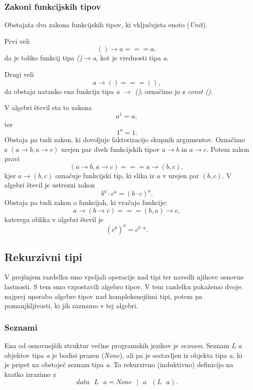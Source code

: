 \documentclass[a4paper, 12pt]{book}
\begin{document}
\subsubsection{Zakoni funkcijskih tipov}

Obstajata dva zakona funkcijskih tipov, ki vključujeta enoto (\emph{Unit}). 

\noindent Prvi veli
$$()\to a===a,$$
da je toliko funkcij tipa \emph{()$\to$a}, kot je vrednosti tipa \emph{a}.

\noindent Drugi veli
$$a\to ()=== (),$$
da obstaja natanko ena funkcija tipa \emph{a $\to$ ()}; označimo jo z \emph{const ()}. 

\noindent V algebri števil sta to zakona
$$a^1=a,$$
ter
$$1^a=1.$$
Obstaja pa tudi zakon, ki dovoljuje faktorizacijo skupnih argumentov. Označimo z $(a\to b, a\to c)$ urejen par dveh funkcijskih tipov $a\to b$ in $a\to c$. Potem zakon pravi
$$(a\to b, a\to c)===a\to(b,c),$$
kjer $a\to(b,c)$ označuje funkcijski tip, ki slika iz $a$ v urejen par $(b,c)$. V algebri števil je ustrezni zakon
$$b^a\cdot c^a=(b\cdot c)^a.$$
Obstaja pa tudi zakon o funkcijah, ki vračajo funkcije:
$$a\to (b\to c)===(b,a)\to c,$$
katerega oblika v algebri števil je
$$(c^b)^a=c^{b\cdot a}.$$

\subsection{Rekurzivni tipi}

V prejšnjem razdelku smo vpeljali operacije nad tipi ter navedli njihove osnovne lastnosti. S tem smo vzpostavili algebro tipov. V tem razdelku pokažemo dvoje: najprej uporabo algebre tipov nad kompleksnejšimi tipi, potem pa pomanjkljivosti, ki jih zaznamo v tej algebri.

\subsubsection{Seznami}

Ena od osnovnejših struktur večine programskih jezikov je \emph{seznam}. Seznam \emph{L a} objektov tipa \emph{a} je bodisi prazen (\emph{None}), ali pa je sestavljen iz objekta tipa \emph{a}, ki je pripet na obstoječ seznam tipa \emph{a}. To rekurzivno (induktivno) definicijo na kratko izrazimo z
\begin{equation}
data\text{ }L\text{ }a=None\text{ }\vert\text{ } a\text{ }(L\text{ }a). \label{eq:listHaskell}
\end{equation}
\end{document}
